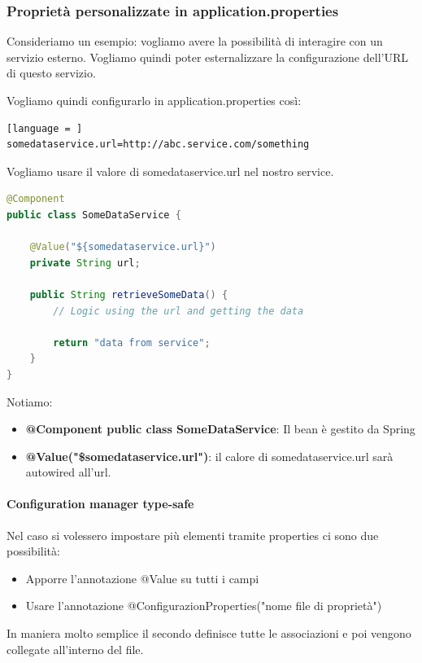 \documentclass[11pt,a4paper]{book}
\begin{document}
\subsubsection{Proprietà personalizzate in application.properties}
Consideriamo un esempio: vogliamo avere la possibilità di interagire con un servizio esterno. Vogliamo quindi poter esternalizzare la configurazione dell'URL di questo servizio.

Vogliamo quindi configurarlo in application.properties così:
\begin{lstlisting}[language = ]
somedataservice.url=http://abc.service.com/something
\end{lstlisting}

Vogliamo usare il valore di somedataservice.url nel nostro service. 

\begin{lstlisting}[language = Java]
@Component
public class SomeDataService {
	
	@Value("${somedataservice.url}")
	private String url;

	public String retrieveSomeData() {
		// Logic using the url and getting the data
	
		return "data from service";
	}
}
\end{lstlisting}

Notiamo:
\begin{itemize}
	\item \textbf{@Component public class SomeDataService}: Il bean è gestito da Spring
	\item \textbf{@Value("\${somedataservice.url}")}: il calore di somedataservice.url sarà autowired all'url.
\end{itemize}

\paragraph{Configuration manager type-safe}
Nel caso si volessero impostare più elementi tramite properties ci sono due possibilità:
\begin{itemize}
	\item Apporre l'annotazione @Value su tutti i campi
	\item Usare l'annotazione @ConfigurazionProperties("nome file di proprietà")
\end{itemize}

In maniera molto semplice il secondo definisce tutte le associazioni e poi vengono collegate all'interno del file.
\end{document}
